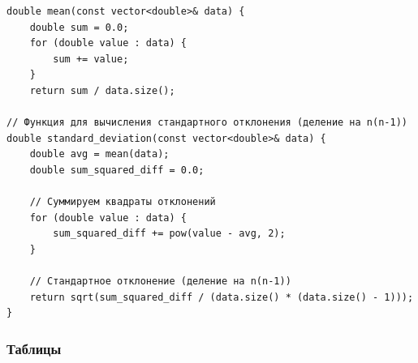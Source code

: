 \begin{lstlisting}[label=listing2, caption=Функция для вычисления среднего значения]
double mean(const vector<double>& data) {
    double sum = 0.0;
    for (double value : data) {
        sum += value;
    }
    return sum / data.size();

// Функция для вычисления стандартного отклонения (деление на n(n-1))
double standard_deviation(const vector<double>& data) {
    double avg = mean(data);
    double sum_squared_diff = 0.0;

    // Суммируем квадраты отклонений
    for (double value : data) {
        sum_squared_diff += pow(value - avg, 2);
    }

    // Стандартное отклонение (деление на n(n-1))
    return sqrt(sum_squared_diff / (data.size() * (data.size() - 1)));
}
\end{lstlisting}

\subsubsection{Таблицы}

\begin{table}[h!]
\centering
{}
\caption{Опытные данные и чувствительность пластин вертикального отклонения (ПВО)}
\end{table}

\begin{table}[h!]
\centering
{}
\caption{Опытные данные и чувствительность пластин горизонтального отклонения (ПГО)}
\end{table}


